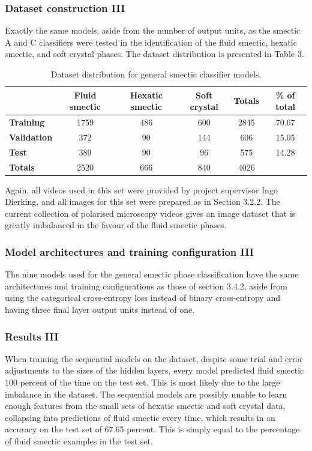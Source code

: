 \documentclass[12pt]{article}
\begin{document}
\subsubsection{Dataset construction III}
Exactly the same models, aside from the number of output units, as the smectic A and C classifiers were tested in the identification of the fluid smectic, hexatic smectic, and soft crystal phases. The dataset distribution is presented in Table 3.
\begin{table}[!htb]
\begin{center}
\caption{Dataset distribution for general smectic classifier models.}
\begin{tabular}{l|c|c|c|c|c}
\toprule
& \textbf{Fluid smectic} & \textbf{Hexatic smectic} & \textbf{Soft crystal} & \textbf{Totals} & \textbf{\% of total}\\
\midrule
\textbf{Training} & 1759 & 486 & 600 & 2845 & 70.67\\
\textbf{Validation} & 372 & 90 & 144 & 606 & 15.05\\
\textbf{Test} & 389 & 90 & 96 & 575 & 14.28\\
\midrule
\textbf{Totals} & 2520 & 666 & 840 & 4026\\
\bottomrule
\end{tabular}
\end{center}
\end{table}
Again, all videos used in this set were provided by project supervisor Ingo Dierking, and all images for this set were prepared as in Section 3.2.2. The current collection of polarised microscopy videos gives an image dataset that is greatly imbalanced in the favour of the fluid smectic phases. 
\subsubsection{Model architectures and training configuration III}
The nine models used for the general smectic phase classification have the same architectures and training configurations as those of section 3.4.2, aside from using the categorical cross-entropy loss instead of binary cross-entropy and having three final layer output units instead of one. 
\subsubsection{Results III}
When training the sequential models on the dataset, despite some trial and error adjustments to the sizes of the hidden layers, every model predicted fluid smectic 100 percent of the time on the test set. This is most likely due to the large imbalance in the dataset. The sequential models are possibly unable to learn enough features from the small sets of hexatic smectic and soft crystal data, collapsing into predictions of fluid smectic every time, which results in an accuracy on the test set of 67.65 percent. This is simply equal to the percentage of fluid smectic examples in the test set.
\end{document}
